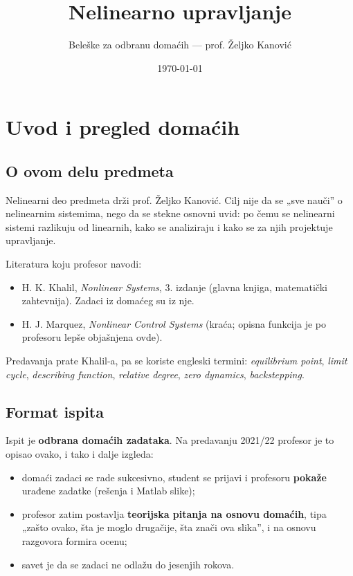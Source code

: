 \documentclass[11pt,a4paper,parskip=half,headsepline,numbers=noenddot]{scrartcl}
\title{Nelinearno upravljanje}
\subtitle{Beleške za odbranu domaćih --- prof. Željko Kanović}
\author{}
\date{\today}
\begin{document}
\maketitle
\thispagestyle{plain.scrheadings}
\tableofcontents
\clearpage

\section{Uvod i pregled domaćih}

\subsection{O ovom delu predmeta}

Nelinearni deo predmeta drži prof. Željko Kanović. Cilj nije da se „sve nauči'' o nelinearnim sistemima, nego da se stekne osnovni uvid: po čemu se nelinearni sistemi razlikuju od linearnih, kako se analiziraju i kako se za njih projektuje upravljanje.

Literatura koju profesor navodi:

\begin{itemize}
\item H. K. Khalil, \emph{Nonlinear Systems}, 3. izdanje (glavna knjiga, matematički zahtevnija). Zadaci iz domaćeg su iz nje.
\item H. J. Marquez, \emph{Nonlinear Control Systems} (kraća; opisna funkcija je po profesoru lepše objašnjena ovde).
\end{itemize}

Predavanja prate Khalil-a, pa se koriste engleski termini: \emph{equilibrium point}, \emph{limit cycle}, \emph{describing function}, \emph{relative degree}, \emph{zero dynamics}, \emph{backstepping}.

\subsection{Format ispita}

Ispit je \textbf{odbrana domaćih zadataka}. Na predavanju 2021/22 profesor je to opisao ovako, i tako i dalje izgleda:

\begin{itemize}
\item domaći zadaci se rade sukcesivno, student se prijavi i profesoru \textbf{pokaže} urađene zadatke (rešenja i Matlab slike);
\item profesor zatim postavlja \textbf{teorijska pitanja na osnovu domaćih}, tipa „zašto ovako, šta je moglo drugačije, šta znači ova slika'', i na osnovu razgovora formira ocenu;
\item savet je da se zadaci ne odlažu do jesenjih rokova.
\end{itemize}
\end{document}
